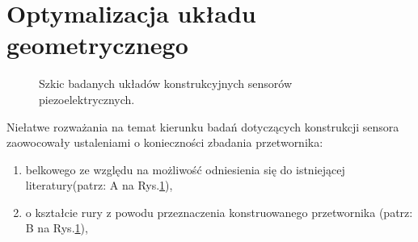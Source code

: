\section{Optymalizacja układu geometrycznego}
\label{sec:construction_optymization}
\begin{figure}[htbp]
\centering
{}%
\caption{Szkic badanych układów konstrukcyjnych sensorów piezoelektrycznych.}
\label{fig:construct_scetch}
\end{figure}
Niełatwe rozważania na temat kierunku badań dotyczących konstrukcji sensora zaowocowały ustaleniami o konieczności zbadania przetwornika:
\begin{enumerate}
\item belkowego ze względu na możliwość odniesienia się do istniejącej literatury(patrz: A na Rys.\ref{fig:construct_scetch}),
\item o kształcie rury z powodu przeznaczenia konstruowanego przetwornika (patrz: B na Rys.\ref{fig:construct_scetch}),
\end{enumerate}
